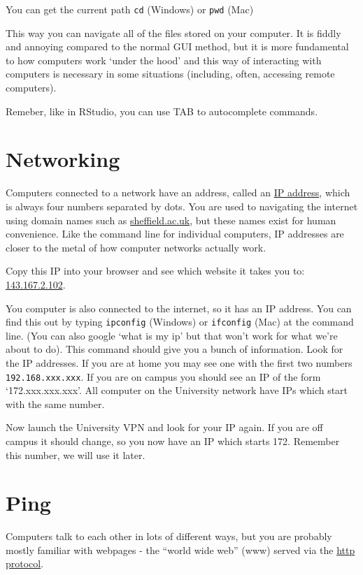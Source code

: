 \documentclass[
]{book}
\begin{document}
You can get the current path \texttt{cd} (Windows) or \texttt{pwd} (Mac)

This way you can navigate all of the files stored on your computer. It is fiddly and annoying compared to the normal GUI method, but it is more fundamental to how computers work `under the hood' and this way of interacting with computers is necessary in some situations (including, often, accessing remote computers).

Remeber, like in RStudio, you can use TAB to autocomplete commands.

\hypertarget{networking}{%
\section{Networking}\label{networking}}

Computers connected to a network have an address, called an \href{https://en.wikipedia.org/wiki/Internet_Protocol}{IP address}, which is always four numbers separated by dots. You are used to navigating the internet using domain names such as \href{}{sheffield.ac.uk}, but these names exist for human convenience. Like the command line for individual computers, IP addresses are closer to the metal of how computer networks actually work.

Copy this IP into your browser and see which website it takes you to: \href{http://143.167.2.102}{143.167.2.102}.

You computer is also connected to the internet, so it has an IP address. You can find this out by typing \texttt{ipconfig} (Windows) or \texttt{ifconfig} (Mac) at the command line. (You can also google `what is my ip' but that won't work for what we're about to do). This command should give you a bunch of information. Look for the IP addresses. If you are at home you may see one with the first two numbers \texttt{192.168.xxx.xxx}. If you are on campus you should see an IP of the form `172.xxx.xxx.xxx'. All computer on the University network have IPs which start with the same number.

Now launch the University VPN and look for your IP again. If you are off campus it should change, so you now have an IP which starts 172. Remember this number, we will use it later.

\hypertarget{ping}{%
\section{Ping}\label{ping}}

Computers talk to each other in lots of different ways, but you are probably mostly familiar with webpages - the ``world wide web'' (www) served via the \href{https://en.wikipedia.org/wiki/Hypertext_Transfer_Protocol}{http protocol}.
\end{document}
